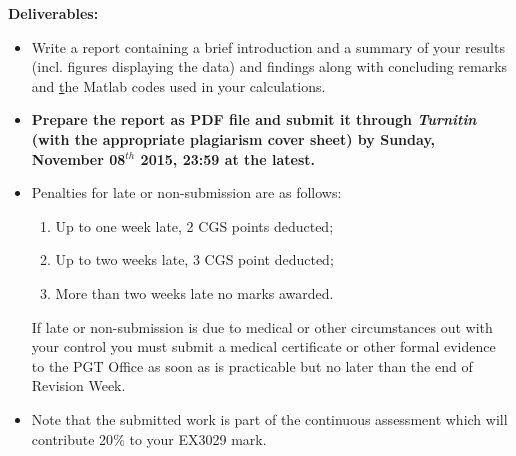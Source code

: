 \documentclass[12pts,a4paper,amsmath,amssymb,floatfix]{article}%
\begin{document}
{\bf Deliverables:}
\begin{itemize}
\item Write a report containing a brief introduction and a summary of your results (incl. figures displaying the data) and findings along with concluding remarks and {\underline the Matlab codes} used in your calculations. 
%
\item {\bf Prepare the report as PDF file and submit it through {\it Turnitin} (with the appropriate plagiarism cover sheet) by Sunday, November 08$^{th}$ 2015, 23:59 at the latest.}
%
\item Penalties for late or non-submission are as follows:
\begin{enumerate}%
\item Up to one week late, 2 CGS points deducted;
\item Up to two weeks late, 3 CGS point deducted;
\item More than two weeks late no marks awarded.
\end{enumerate}
If late or non-submission is due to medical or other circumstances out with your control you must submit a medical certificate or other formal evidence to the PGT Office as soon as is practicable but no later than the end of Revision Week.


\item Note that the submitted work is part of the continuous assessment which will contribute 20$\%$ to your EX3029 mark.

\end{itemize}



\clearpage

%
\end{document}
